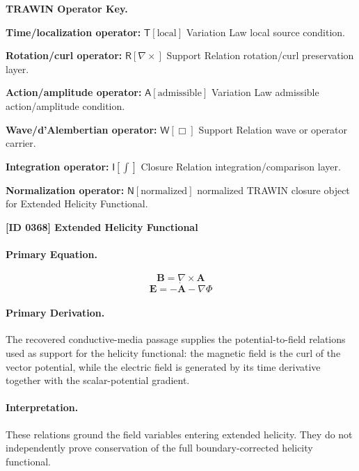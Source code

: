 \par\vspace{0.45\baselineskip}
\noindent\begin{minipage}[t]{\linewidth}
\begingroup
\small
\raggedright
\textbf{TRAWIN Operator Key.}\par
\noindent\textbf{Time/localization operator:} $\mathsf{T}\!\left[\mathrm{local}\right]$ Variation Law local source condition.\par
\noindent\textbf{Rotation/curl operator:} $\mathsf{R}\!\left[\nabla\times\right]$ Support Relation rotation/curl preservation layer.\par
\noindent\textbf{Action/amplitude operator:} $\mathsf{A}\!\left[\mathrm{admissible}\right]$ Variation Law admissible action/amplitude condition.\par
\noindent\textbf{Wave/d'Alembertian operator:} $\mathsf{W}\!\left[\Box\right]$ Support Relation wave or operator carrier.\par
\noindent\textbf{Integration operator:} $\mathsf{I}\!\left[\int\right]$ Closure Relation integration/comparison layer.\par
\noindent\textbf{Normalization operator:} $\mathsf{N}\!\left[\mathrm{normalized}\right]$ normalized TRAWIN closure object for Extended Helicity Functional.\par
\endgroup
\end{minipage}

\clearpage
\noindent\textbf{[ID 0368] Extended Helicity Functional}\par
\vspace{0.35em}
\paragraph{Primary Equation.}
\[
\mathbf{B}=\nabla\times\mathbf{A}
\]
\[
\mathbf{E}=-\dot{\mathbf{A}}-\nabla\Phi
\]

\paragraph{Primary Derivation.}
The recovered conductive-media passage supplies the potential-to-field relations used as support for the helicity functional: the magnetic field is the curl of the vector potential, while the electric field is generated by its time derivative together with the scalar-potential gradient.

\paragraph{Interpretation.}
These relations ground the field variables entering extended helicity. They do not independently prove conservation of the full boundary-corrected helicity functional.

